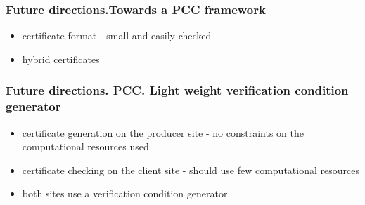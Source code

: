\documentclass{beamer}
\begin{document}
\begin{frame}\frametitle{Future directions.Towards a PCC framework  }
		     \begin{itemize}
	                \item certificate format - small and easily checked 
			  \item hybrid certificates
		     \end{itemize}
          
\end{frame}

\begin{frame}\frametitle{Future directions. PCC. Light weight verification condition generator }
		     \begin{itemize}
                          \item  certificate generation on the producer site - no constraints on the computational resources used
			    \item certificate checking on the  client site - should use few computational resources
			      \item both sites use a verification condition generator
		       \end{itemize}
                     

\begin{figure}[hc]
\begin{center}
\end{center}
\end{figure}

\end{frame}
\end{document}
